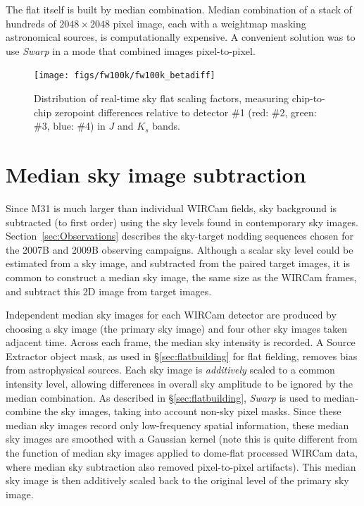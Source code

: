\documentclass[iop]{emulateapj}
\newcommand{\sw}[1]{\textit{#1}} %
\newcommand{\Sec}[1]{\S\ref{sec:#1}}  %
\begin{document}
The flat itself is built by median combination.
Median combination of a stack of hundreds of $2048\times2048$ pixel image, each with a weightmap masking astronomical sources, is computationally expensive.
A convenient solution was to use \sw{Swarp} \citep[an image-mosaicing software package,][]{Bertin:2002} in a mode that combined images pixel-to-pixel.

\begin{figure}[t]
\centering
\texttt{[image: figs/fw100k/fw100k\_betadiff]}
\caption{Distribution of real-time sky flat scaling factors, measuring chip-to-chip zeropoint differences relative to detector \#1 (red: \#2, green: \#3, blue: \#4) in $J$ and $K_s$ bands.
}
\label{fig:fw100k_zpdiff}
\end{figure}

\section{Median sky image subtraction}
\label{sec:mediansky}

Since M31 is much larger than individual WIRCam fields, sky background is subtracted (to first order) using the sky levels found in contemporary sky images.
Section~\ref{sec:Observations} describes the sky-target nodding sequences chosen for the 2007B and 2009B observing campaigns. 
Although a scalar sky level could be estimated from a sky image, and subtracted from the paired target images, it is common to construct a median sky image, the same size as the WIRCam frames, and subtract this 2D image from target images.

Independent median sky images for each WIRCam detector are produced by choosing a sky image (the primary sky image) and four other sky images taken adjacent time.
Across each frame, the median sky intensity is recorded.
A Source Extractor object mask, as used in \Sec{flatbuilding} for flat fielding, removes bias from astrophysical sources.
Each sky image is \emph{additively} scaled to a common intensity level, allowing differences in overall sky amplitude to be ignored by the median combination.
As described in \Sec{flatbuilding}, \sw{Swarp} is used to median-combine the sky images, taking into account non-sky pixel masks.
Since these median sky images record only low-frequency spatial information, these median sky images are smoothed with a Gaussian kernel (note this is quite different from the function of median sky images applied to dome-flat processed WIRCam data, where median sky subtraction also removed pixel-to-pixel artifacts).
This median sky image is then additively scaled back to the original level of the primary sky image.
\end{document}
